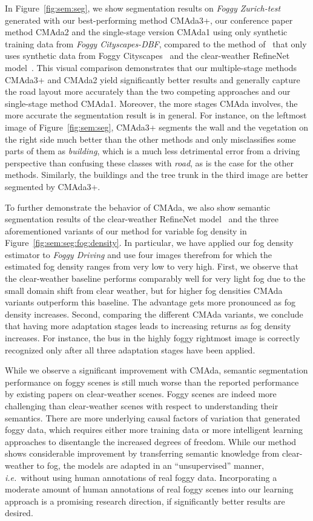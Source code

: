 \documentclass[twocolumn]{svjour3}          \smartqed  \usepackage{graphicx}
\newcommand{\ie}{\mbox{\emph{i.e.\ }}}
\begin{document}
In Figure~\ref{fig:sem:seg}, we show segmentation results on \emph{Foggy Zurich-test} generated with our best-performing method CMAda3+, our conference paper method CMAda2 and the single-stage version CMAda1 using only synthetic training data from \emph{Foggy Cityscapes-DBF}, compared to the method of~\cite{SFSU_synthetic} that only uses synthetic data from Foggy Cityscapes~\cite{SFSU_synthetic} and the clear-weather RefineNet model~\cite{refinenet}. This visual comparison demonstrates that our multiple-stage methods CMAda3+ and CMAda2 yield significantly better results and generally capture the road layout more accurately than the two competing approaches and our single-stage method CMAda1. Moreover, the more stages CMAda involves, the more accurate the segmentation result is in general. For instance, on the leftmost image of Figure~\ref{fig:sem:seg}, CMAda3+ segments the wall and the vegetation on the right side much better than the other methods and only misclassifies some parts of them as \emph{building}, which is a much less detrimental error from a driving perspective than confusing these classes with \emph{road}, as is the case for the other methods. Similarly, the buildings and the tree trunk in the third image are better segmented by CMAda3+.

To further demonstrate the behavior of CMAda, we also show semantic segmentation results of the clear-weather RefineNet model~\cite{refinenet} and the three aforementioned variants of our method for variable fog density in Figure~\ref{fig:sem:seg:fog:density}. In particular, we have applied our fog density estimator to \emph{Foggy Driving} and use four images therefrom for which the estimated fog density ranges from very low to very high. First, we observe that the clear-weather baseline performs comparably well for very light fog due to the small domain shift from clear weather, but for higher fog densities CMAda variants outperform this baseline. The advantage gets more pronounced as fog density increases. Second, comparing the different CMAda variants, we conclude that having more adaptation stages leads to increasing returns as fog density increases. For instance, the bus in the highly foggy rightmost image is correctly recognized only after all three adaptation stages have been applied.
 
While we observe a significant improvement with CMAda, semantic segmentation performance on foggy scenes is still much worse than the reported performance by existing papers on clear-weather scenes. Foggy scenes are indeed more challenging than clear-weather scenes with respect to understanding their semantics. There are more underlying causal factors of variation that generated foggy data, which requires either more training data or more intelligent learning approaches to disentangle the increased degrees of freedom. While our method shows considerable improvement by transferring semantic knowledge from clear-weather to fog, the models are adapted in an ``unsupervised'' manner, \ie{}without using human annotations of real foggy data. Incorporating a moderate amount of human annotations of real foggy scenes into our learning approach is a promising research direction, if significantly better results are desired. 
\end{document}
